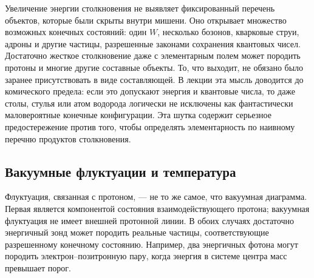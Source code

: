 Увеличение энергии столкновения не выявляет фиксированный перечень объектов, которые были скрыты внутри мишени. Оно открывает множество возможных конечных состояний: один \(W\), несколько бозонов, кварковые струи, адроны и другие частицы, разрешенные законами сохранения квантовых чисел. Достаточно жесткое столкновение даже с элементарным полем может породить протоны и многие другие составные объекты. То, что выходит, не обязано было заранее присутствовать в виде составляющей. В лекции эта мысль доводится до комического предела: если это допускают энергия и квантовые числа, то даже столы, стулья или атом водорода логически не исключены как фантастически маловероятные конечные конфигурации. Эта шутка содержит серьезное предостережение против того, чтобы определять элементарность по наивному перечню продуктов столкновения.

\subsection{Вакуумные флуктуации и температура}

Флуктуация, связанная с протоном, — не то же самое, что вакуумная диаграмма. Первая является компонентой состояния взаимодействующего протона; вакуумная флуктуация не имеет внешней протонной линии. В обоих случаях достаточно энергичный зонд может породить реальные частицы, соответствующие разрешенному конечному состоянию. Например, два энергичных фотона могут породить электрон--позитронную пару, когда энергия в системе центра масс превышает порог.

\begin{classroomqa}
\end{classroomqa}

\begin{classroomqa}
\end{classroomqa}

